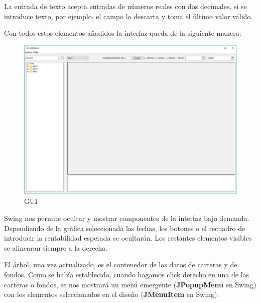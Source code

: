 \documentclass[12pt, a4paper]{article}
\begin{document}
La entrada de texto acepta entradas de números reales con dos decimales, si se introduce texto, por ejemplo, el campo lo descarta y toma el último valor válido.
\newpage

Con todos estos elementos añadidos la interfaz queda de la siguiente manera:

\begin{figure}[htbp]
	\centering
	\includegraphics[width=\textwidth]{figuras/gui2.PNG}
	\caption{GUI}
	\label{fig:gui2}
	\end {figure}

Swing nos permite ocultar y mostrar componentes de la interfaz bajo demanda. Dependiendo de la gráfica seleccionada las fechas, los botones o el recuadro de introducir la rentabilidad esperada se ocultarán. Los restantes elementos visibles se alinearan siempre a la derecha.\\
\newpage

El árbol, una vez actualizado, es el contenedor de los datos de carteras y de fondos. Como se había establecido, cuando hagamos click derecho en una de las carteras o fondos, se nos mostrará un menú emergente (\textbf{JPopupMenu} en Swing) con los elementos seleccionados en el diseño (\textbf{JMenuItem} en Swing):
\end{document}
